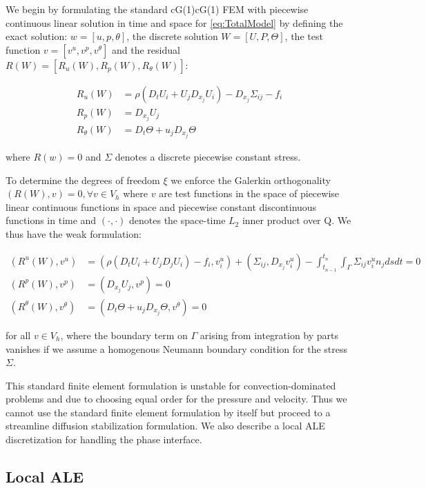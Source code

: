 We begin by formulating the standard cG(1)cG(1) FEM
\cite{ErikssonEstepEtAl1996} with piecewise continuous linear solution in time
and space for \ref{eq:TotalModel} by defining the exact solution: $w =
[u, p, \theta]$, the discrete solution $W = [U, P, \Theta]$, the
test function $v = [v^u, v^p, v^\theta]$ and the residual $R(W) =
[R_u(W), R_p(W), R_\theta(W)]$:

\begin{align*}
  R_u(W) &= \rho(D_t U_i + U_j D_{x_j} U_i) - D_{x_j} \Sigma_{ij} - f_i\\
  R_p(W) &= D_{x_j} U_j\\
  R_\theta(W) &= D_t \Theta + u_j D_{x_j} \Theta
\end{align*}

where $R(w) = 0$ and $\Sigma$ denotes a discrete piecewise constant
stress.

To determine the degrees of freedom $\xi$ we enforce the Galerkin
orthogonality $(R(W), v) = 0, \forall v \in V_h$ where $v$ are test
functions in the space of piecewise linear continuous functions in
space and piecewise constant discontinuous functions in time and
$(\cdot,\cdot)$ denotes the space-time $L_2$ inner product over Q. We
thus have the weak formulation:

\begin{align*}
  (R^u(W), v^u) &= (\rho(D_t U_i + U_j D_j U_i) - f_i, v^u_i) + (\Sigma_{ij}, D_{x_j} v^u_i) - \int_{t_{n-1}}^{t_n}\int_\Gamma \Sigma_{ij} v^u_i n_j ds dt = 0\\
  (R^p(W), v^p) &= (D_{x_j} U_j, v^p) = 0\\
  (R^\theta(W), v^\theta) &= (D_t \Theta + u_j D_{x_j} \Theta, v^\theta) = 0
\end{align*}

for all $v \in V_h$, where the boundary term on $\Gamma$ arising from
integration by parts vanishes if we assume a homogenous Neumann
boundary condition for the stress $\Sigma$.

This standard finite element formulation is unstable for
convection-dominated problems and due to choosing equal order for the
pressure and velocity. Thus we cannot use the standard finite element
formulation by itself but proceed to a streamline diffusion
stabilization formulation. We also describe a local ALE discretization
for handling the phase interface.

\subsection{Local ALE}


